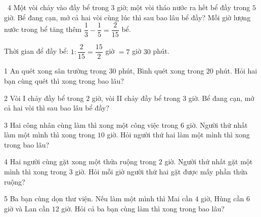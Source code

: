 \gap
\begin{exbox}{\ExWord\ 4}
Một vòi chảy vào đầy bể trong $3$ giờ; một vòi tháo nước ra hết bể đầy trong $5$ giờ. Bể đang cạn, mở cả hai vòi cùng lúc thì sau bao lâu bể đầy?
\guide
Mỗi giờ lượng nước trong bể tăng thêm $\dfrac13-\dfrac15=\dfrac2{15}$ bể.\par
Thời gian để đầy bể: $1:\dfrac2{15}=\dfrac{15}2$ giờ $=7$ giờ $30$ phút.
\end{exbox}
\begin{probbox}{1}{\relax}
An quét xong sân trường trong $30$ phút, Bình quét xong trong $20$ phút. Hỏi hai bạn cùng quét thì xong trong bao lâu?
\end{probbox}
\gap
\begin{probbox}{2}{\relax}
Vòi I chảy đầy bể trong $2$ giờ, vòi II chảy đầy bể trong $3$ giờ. Bể đang cạn, mở cả hai vòi thì sau bao lâu bể đầy?
\end{probbox}
\gap
\begin{probbox}{3}{\relax}
Hai công nhân cùng làm thì xong một công việc trong $6$ giờ. Người thứ nhất làm một mình thì xong trong $10$ giờ. Hỏi người thứ hai làm một mình thì xong trong bao lâu?
\end{probbox}
\gap
\begin{probbox}{4}{\relax}
Hai người cùng gặt xong một thửa ruộng trong $2$ giờ. Người thứ nhất gặt một mình thì xong trong $3$ giờ. Hỏi mỗi giờ người thứ hai gặt được mấy phần thửa ruộng?
\end{probbox}
\gap
\begin{probbox}{5}{\relax}
Ba bạn cùng dọn thư viện. Nếu làm một mình thì Mai cần $4$ giờ, Hùng cần $6$ giờ và Lan cần $12$ giờ. Hỏi cả ba bạn cùng làm thì xong trong bao lâu?
\end{probbox}
